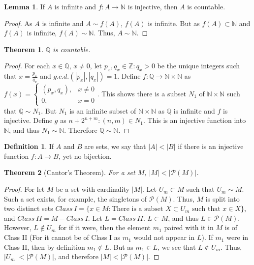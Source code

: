 \documentclass[oneside]{book}
\newtheorem{theorem}{Theorem}[section]
\theoremstyle{definition}
\newtheorem{definition}{Definition}[section]
\newtheorem{lemma}{Lemma}[section]
\begin{document}
\begin{lemma}
If $A$ is infinite and $f:A\rightarrow \mathbb{N}$ is injective, then $A$ is countable.
\end{lemma}
\begin{proof}
As $A$ is infinite and $A\sim f(A)$, $f(A)$ is infinite. But as $f(A)\subset \mathbb{N}$ and $f(A)$ is infinite, $f(A)\sim \mathbb{N}$. Thus, $A\sim \mathbb{N}$. 
\end{proof}

\begin{theorem}
$\mathbb{Q}$ is countable.
\end{theorem}
\begin{proof}
For each $x\in \mathbb{Q}$, $x\ne 0$, let $p_x,q_x\in\mathbb{Z}:q_x>0$ be the unique integers such that $x = \frac{p_x}{q_x}$ and $g.c.d.(|p_x|,|q_x|)=1$. Define $f:\mathbb{Q}\rightarrow \mathbb{N}\times \mathbb{N}$ as $f(x) = \begin{cases}(p_x,q_x), & x\ne 0 \\ 0, & x=0\end{cases}$. This shows there is a subset $N_1$ of $\mathbb{N}\times \mathbb{N}$ such that $\mathbb{Q}\sim N_1$. But $N_1$ is an infinite subset of $\mathbb{N}\times\mathbb{N}$ as $\mathbb{Q}$ is infinite and $f$ is injective. Define $g$ as $n+2^{n+m}:(n,m)\in N_1$. This is an injective function into $\mathbb{N}$, and thus $N_1 \sim \mathbb{N}$. Therefore $\mathbb{Q}\sim \mathbb{N}$.
\end{proof}

\begin{definition}
If $A$ and $B$ are sets, we say that $|A|<|B|$ if there is an injective function $f:A\rightarrow B$, yet no bijection.
\end{definition}

\begin{theorem}[Cantor's Theorem]
For a set $M$, $|M|<|\mathcal{P}(M)|$.
\end{theorem}
\begin{proof}
For let $M$ be a set with cardinality $|M|$. Let $U_m \subset M$ such that $U_m \sim M$. Such a set exists, for example, the singletons of $\mathcal{P}(M)$. Thus, $M$ is split into two distinct sets $Class\ I=\{x\in M: \textrm{There is a subset } X\subset U_m\textrm{ such that }x\in X\}$, and $Class\ II=M-Class\ I$. Let $L = Class\ II$. $L\subset M$, and thus $L\in \mathcal{P}(M)$. However, $L \notin U_m$ for if it were, then the element $m_1$ paired with it in $M$ is of Class II (For it cannot be of Class I as $m_1$ would not appear in $L$). If $m_1$ were in Class II, then by definition $m_1 \notin L$. But as $m_1 \in L$, we see that $L\notin U_m$. Thus, $|U_m| <|\mathcal{P}(M)|$, and therefore $|M|<|\mathcal{P}(M)|$.
\end{proof}
\end{document}
